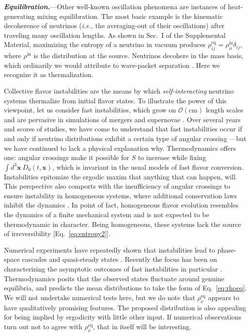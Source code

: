 \documentclass[aps,prl,twocolumn,groupedaddress]{revtex4-2}
\begin{document}
\textbf{\textit{Equilibration.}}---Other well-known oscillation phenomena are instances of heat-generating mixing equilibration. The most basic example is the kinematic decoherence of neutrinos (\textit{i.e.}, the averaging-out of their oscillations) after traveling many oscillation lengths. As shown in Sec.~I of the Supplemental Material, maximizing the entropy of a neutrino in vacuum produces $\rho^\textrm{eq}_{ij} = \rho^\textrm{in}_{ii} \delta_{ij}$, where $\rho^\textrm{in}$ is the distribution at the source. Neutrinos decohere in the mass basis, which ordinarily we would attribute to wave-packet separation \cite{akhmedov2009}. Here we recognize it as thermalization.

Collective flavor instabilities are the means by which \textit{self-interacting} neutrino systems thermalize from initial flavor states. To illustrate the power of this viewpoint, let us consider fast instabilities, which grow on $\mathcal{O}(\textrm{cm})$ length scales and are pervasive in simulations of mergers and supernovae \cite{tamborra2021, richers2022}. Over several years and scores of studies, we have come to understand that fast instabilities occur if and only if neutrino distributions exhibit a certain type of angular crossing \cite{sawyer2016, chakraborty2016c, dasgupta2017, izaguirre2017, capozzi2017, abbar2018, capozzi2019, martin2020, johns2021, morinaga2022, dasgupta2022}---but we have continued to lack a physical explanation why. Thermodynamics offers one: angular crossings make it possible for $S$ to increase while fixing $\int d^3\boldsymbol{x}~D_0 (t, \boldsymbol{x})$, which is invariant in the usual models of fast flavor conversion. Instabilities epitomize the ergodic maxim that anything that can happen, will. This perspective also comports with the insufficiency of angular crossings to ensure instability in homogeneous systems, where additional conservation laws inhibit the dynamics \cite{johns2020}. In point of fact, homogeneous flavor evolution resembles the dynamics of a finite mechanical system \cite{hannestad2006, duan2007b, raffelt2013b, johns2018, johns2020, padillagay2022, fiorillo2023, fiorillo2023b} and is not expected to be thermodynamic in character. Being homogeneous, these systems lack the source of irreversibility [Eq.~\eqref{eq:entropy2}].

Numerical experiments have repeatedly shown that instabilities lead to phase-space cascades and quasi-steady states \cite{sawyer2005, raffelt2007b, mangano2014, mirizzi2015, johns2020b, bhattacharyya2020, richers2021b, nagakura2022}. Recently the focus has been on characterizing the asymptotic outcomes of fast instabilities in particular \cite{bhattacharyya2021, nagakura2023b, zaizen2023b, zaizen2023}. Thermodynamics posits that the observed states fluctuate around genuine equilibria, and predicts the mean distributions to take the form of Eq.~\eqref{eq:rhoeq}. We will not undertake numerical tests here, but we do note that $\rho_\nu^\textrm{eq}$ appears to have qualitatively promising features. The proposed distribution is also appealing for being implied by ergodicity with little other input. If numerical observations turn out not to agree with $\rho_\nu^\textrm{eq}$, that in itself will be interesting.
\end{document}
